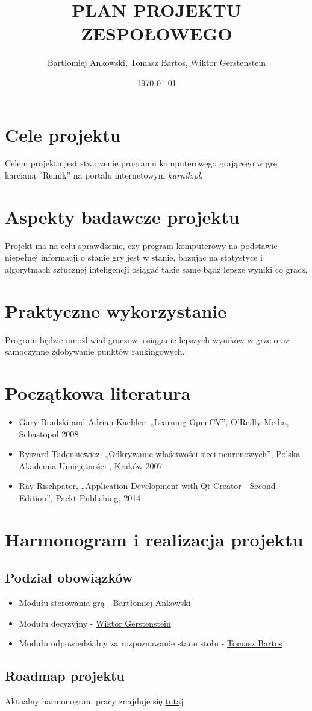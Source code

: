 \documentclass[a4paper, 11pt]{article}
\title{PLAN PROJEKTU ZESPOŁOWEGO}
\author{Bartłomiej Ankowski, Tomasz Bartos, Wiktor Gerstenstein}
\date{\today}
\begin{document}
\maketitle
\section{Cele projektu}
Celem projektu jest stworzenie programu komputerowego grającego w grę karcianą ''Remik'' na portalu internetowym \textit{kurnik.pl}.

\section{Aspekty badawcze projektu}
Projekt ma na celu sprawdzenie, czy program komputerowy na podstawie niepełnej informacji o stanie gry  jest w stanie, bazując na statystyce i algorytmach sztucznej inteligencji osiągać takie same bądź lepsze wyniki co gracz.

\section{Praktyczne wykorzystanie}
Program będzie umożliwiał graczowi osiąganie lepszych wyników w grze oraz samoczynne zdobywanie punktów rankingowych.

\section{Początkowa literatura}
\begin{itemize}
\item Gary Bradski and Adrian Kaehler: „Learning OpenCV”, O’Reilly Media, Sebastopol 2008
\item Ryszard Tadeusiewicz: „Odkrywanie właściwości sieci neuronowych”, Polska Akademia Umiejętności , Kraków 2007
\item Ray Rischpater, „Application Development with Qt Creator - Second Edition”, Packt Publishing, 2014
\end{itemize}

\section{Harmonogram i realizacja projektu}

\subsection{Podział obowiązków}
\begin{itemize}
\item Modułu sterowania grą - \underline{Bartłomiej Ankowski}
\item Modułu decyzyjny - \underline{Wiktor Gerstenstein}
\item Modułu odpowiedzialny za rozpoznawanie stanu stołu - \underline{Tomasz Bartos}
\end{itemize}

\subsection{Roadmap projektu}
Aktualny harmonogram pracy znajduje się \href{https://trello.com/b/PmTsc0OK/team-project-art-roadmap}{tutaj}
\end{document}
